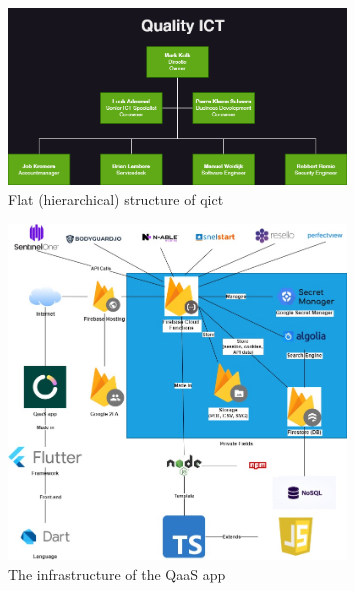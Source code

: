\begin{figure}[htbp]
      \centering
      \includegraphics[width=0.8\textwidth]{Figures/OrganizationalDiagram_QICT.png}
      \caption{Flat (hierarchical) structure of \acrshort{qict}}
\end{figure}

\begin{figure}[htbp]
      \centering
      \includegraphics[width=0.8\textwidth]{Figures/QaaS App Infraastructure.jpg}
      \caption{The infrastructure of the QaaS app}
\end{figure}

